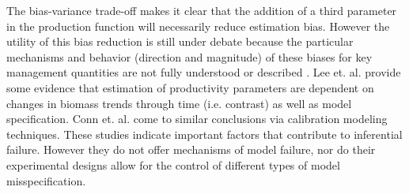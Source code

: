 \documentclass[12pt]{ucscthesis}
\begin{document}
%
The bias-variance trade-off \cite{ramasubramanian_machine_2017} makes it
clear that the addition of a third parameter in the production function will
necessarily reduce estimation bias. However the utility of this bias reduction
is still under debate because the particular mechanisms and behavior (direction and magnitude) %
of these biases for key management quantities %
are not fully understood or described \cite{munyandorero_analytical_2023}. 
Lee et. al. \cite{lee_can_2012} provide some evidence that estimation of productivity parameters %
are dependent on changes in biomass trends through time (i.e. contrast) as well %
as model specification. Conn et. al. \cite{conn_when_2010} come to similar conclusions %
via calibration modeling techniques. These studies indicate important factors that
contribute to inferential failure. However they do not offer mechanisms of model
failure, nor do their experimental designs allow for the control of different
types of model misspecification.




\end{document}
